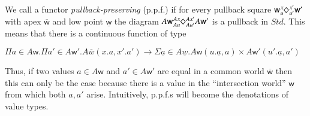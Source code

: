 \documentclass[orivec]{llncs}
\newif\iffull\fullfalse
\newcommand{\sq}[4]{\tensor*[^{#1}_{#2}]{\Diamond}{^{#3}_{#4}}}
\newcommand\w{\ensuremath{\mathsf{w}}\xspace}
\newcommand\Std{\ensuremath{\mathit{Std}}\xspace}
\begin{document}
\begin{definition}
We call a functor
\emph{pullback-preserving} (p.p.f.) if for every pullback square
$\w\sq{x}{u}{x'}{u'}\w'$ with apex $\overline{\w}$ and low point
$\underline{\w}$ the diagram $A\w\sq{Ax}{Au}{Ax'}{Au'}A\w'$ is a pullback
in $\Std$. This means that there is a continuous function of type 
\iffull
\[
\Pi a\in A\w.\Pi a'\in A\w'.A\overline{w}(x.a,x'.a')\rightarrow \Sigma
\underline{a}\in
A\underline{w}.A\w(u.\underline{a},a)\times
A\w'(u'.\underline{a},a')
\]
\else

\(
\Pi a\in A\w.\Pi a'\in A\w'.A\overline{w}(x.a,x'.a')\rightarrow \Sigma
\underline{a}\in
A\underline{w}.A\w(u.\underline{a},a)\times
A\w'(u'.\underline{a},a')
\)
\fi
\end{definition}
Thus, if two values $a\in A\w$ and $a'\in A\w'$ are equal in a common world
$\overline{\w}$ then this can only be the case because there is a value in
the ``intersection world'' $\underline{\w}$ from which both $a,a'$ arise. 
Intuitively, p.p.f.s will become the denotations
of value types.
\iffull
\begin{lemma}
  If $A$ is a p.p.f., $u:\w\rightarrow \w'$ and $a,a'\in A\w$,
  there is a continuous function $A\w'(u.a,u.a')\rightarrow
  A\w(a,a')$. Moreover, the ``common ancestor'' $\underline{a}$ of $a$ and $a'$ is unique up to
$\sim$. 
\end{lemma}
Note that the ordering on worlds and world morphisms is discrete so
that continuity only refers to the $A\w'(u.a,u.a')$ argument.
\fi
\iffull
\begin{definition}[Morphism of functors]\label{morphfun}
  If $A,B$ are p.p.f., a morphism from $A$ to $B$ is a pair
  $e=(e_0,e_1)$ of continuous functions where
  $e_0:\Pi\w.A\w\rightarrow B\w$ and $e_1:\Pi\w.\Pi\w'.\Pi
  x:\w\rightarrow\w'.\Pi a\in A\w.\Pi a'\in
  A\w'.A\w'(x.a,a')\rightarrow B\w'(x.e_0(a),e_0(a'))$. A proof that
  morphisms $e,e'$ are equal is given by a continuous function
  $\mu:\Pi \w.\Pi a\in A\w.B\w(e(a),e'(a))$.
\end{definition}
These morphisms compose in the obvious way and so
the faithful functors and morphisms between them form a category. 
\fi
\end{document}
